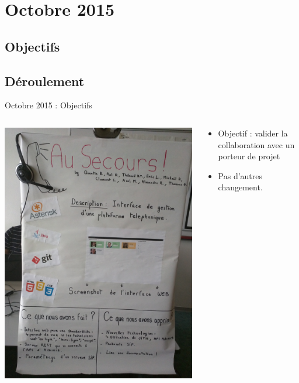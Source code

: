 \documentclass{beamer}
\begin{document}
\section{Octobre 2015}
\subsection{Objectifs}
\subsection{Déroulement}
\begin{frame}{Octobre 2015 : Objectifs}
  \begin{columns}
    \begin{column}{0.5\textwidth}
      \begin{center}
        \includegraphics[width=\textwidth]{includes/201510_salon.jpg}      
      \end{center}
    \end{column}
    \begin{column}{0.5\textwidth}
      \begin{itemize}
        \item Objectif : valider la collaboration avec un porteur de projet
        \item Pas d'autres changement.
      \end{itemize}
    \end{column}
  \end{columns}
\end{frame}
\end{document}
